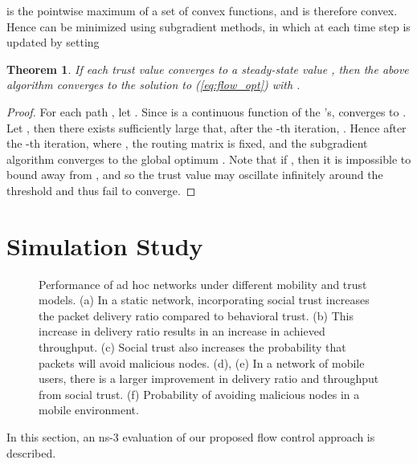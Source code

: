 \documentclass[conference]{IEEEtran}
\newtheorem{thm}{Theorem}
\begin{document}
 is the pointwise maximum of a set of convex functions, and is therefore convex.  Hence  can be minimized using subgradient methods, in which at each time step   is updated by setting





\begin{thm}
If each trust value  converges to a steady-state value , then the above algorithm converges to the solution to (\ref{eq:flow_opt}) with .
\end{thm}

\begin{proof}
For each path , let .  Since  is a continuous function of the 's,  converges to .  Let , then there exists  sufficiently large that, after the -th iteration, .  Hence after the -th iteration, where , the routing matrix is fixed, and the subgradient algorithm converges to the global optimum \cite{bertsekas1999nonlinear}.  Note that if , then it is impossible to bound  away from , and so the trust value may oscillate infinitely around the threshold and thus fail to converge.
\end{proof}







%
 


	



\section{Simulation Study}
\label{sec:simulation}
 \begin{figure*}[t]
\centering

\caption{Performance of ad hoc networks under different mobility and trust models. (a) In a static network, incorporating social trust increases the packet delivery ratio compared to behavioral trust. (b) This increase in delivery ratio results in an increase in achieved throughput.  (c) Social trust also increases the probability that packets will avoid malicious nodes. (d), (e) In a network of mobile users, there is a larger improvement in delivery ratio and throughput from social trust. (f) Probability of avoiding malicious nodes in a mobile environment.}
\label{fig:performance}
\end{figure*}


In this section, an ns-3 \cite{ns3} evaluation of our proposed flow control approach is described.
\end{document}
